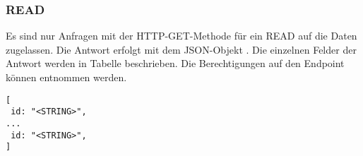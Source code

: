 \subsubsection{READ}
\label{sec:rest:api:user:childs:read}
Es sind nur Anfragen mit der HTTP-GET-Methode für ein READ auf die Daten zugelassen.
Die Antwort erfolgt mit dem JSON-Objekt . Die einzelnen Felder der Antwort werden in Tabelle  beschrieben.
Die Berechtigungen auf den Endpoint können  entnommen werden.

\begin{lstlisting}[caption={JSON-Antwort für einen GET-Aufruf der Route /api/user/childs},label={lst:code:rest:api:user:childs:read:ret},frame=tlrb]
[
 id: "<STRING>",
...
 id: "<STRING>",
]
\end{lstlisting}
